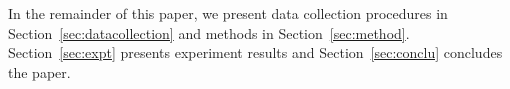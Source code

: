 \documentclass[preprint,12pt]{elsarticle}
\begin{document}
In the remainder of this paper, we present data collection procedures in Section~\ref{sec:datacollection} and methods in Section~\ref{sec:method}. Section~\ref{sec:expt} presents experiment results and Section~\ref{sec:conclu} concludes the paper.


\end{document}

